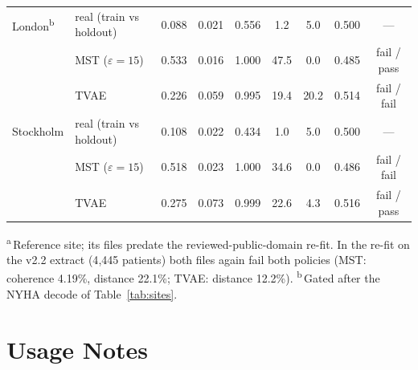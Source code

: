 \documentclass[11pt,a4paper]{article}
\newcommand{\eps}{\ensuremath{\varepsilon}}
\begin{document}
\begin{table}[htbp]
\begin{tabular}{llccccccc}
\addlinespace
London\textsuperscript{b} & real (train vs holdout) & 0.088 & 0.021 & 0.556 & 1.2 & 5.0 & 0.500 & --- \\
 & MST ($\eps{=}15$) & 0.533 & 0.016 & 1.000 & 47.5 & 0.0 & 0.485 & fail / pass \\
 & TVAE & 0.226 & 0.059 & 0.995 & 19.4 & 20.2 & 0.514 & fail / fail \\
\addlinespace
Stockholm & real (train vs holdout) & 0.108 & 0.022 & 0.434 & 1.0 & 5.0 & 0.500 & --- \\
 & MST ($\eps{=}15$) & 0.518 & 0.023 & 1.000 & 34.6 & 0.0 & 0.486 & fail / fail \\
 & TVAE & 0.275 & 0.073 & 0.999 & 22.6 & 4.3 & 0.516 & fail / pass \\
\bottomrule
\end{tabular}

\raggedright\footnotesize \textsuperscript{a}\,Reference site; its files
predate the reviewed-public-domain re-fit. In the re-fit on the v2.2 extract
(4{,}445 patients) both files again fail both policies (MST: coherence 4.19\%,
distance 22.1\%; TVAE: distance 12.2\%).%
\textsuperscript{b}\,Gated after the NYHA decode of Table~\ref{tab:sites}.
\end{table}

\section{Usage Notes}
\end{document}
